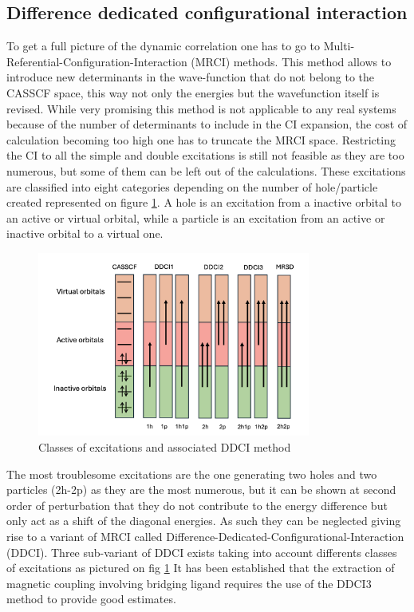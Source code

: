 \documentclass[10pt]{report}
\numberwithin{equation}{section}
\begin{document}
\subsection{Difference dedicated configurational interaction}

To get a full picture of the dynamic correlation one has to go to Multi-Referential-Configuration-Interaction (MRCI) methods.
This method allows to introduce new determinants in the wave-function that do not belong to the CASSCF space, this way not only the energies but the wavefunction itself is revised.
While very promising this method is not applicable to any real systems because of the number of determinants to include in the CI expansion, the cost of calculation becoming too high one has to truncate the MRCI space.
Restricting the CI to all the simple and double excitations is still not feasible as they are too numerous, but some of them can be left out of the calculations. 
These excitations are classified into eight categories depending on the number of hole/particle created represented on figure \ref{DDCI}. 
A hole is an excitation from a inactive orbital to an active or virtual orbital, while a particle is an excitation from an active or inactive orbital to a virtual one.

\begin{figure}
    \centering
    \includegraphics[width=0.8\textwidth]{Images/DDCI.png}
    \caption{Classes of excitations and associated DDCI method}
    \label{DDCI}
\end{figure}
The most troublesome excitations are the one generating two holes and two particles (2h-2p) as they are the most numerous, but it can be shown at second order of perturbation that they do not contribute to the energy difference but only act as a shift of the diagonal energies.
As such they can be neglected giving rise to a variant of MRCI called Difference-Dedicated-Configurational-Interaction (DDCI). 
Three sub-variant of DDCI exists taking into account differents classes of excitations as pictured on fig \ref{DDCI}
It has been established that the extraction of magnetic coupling involving bridging ligand requires the use of the DDCI3 method to provide good estimates.
\end{document}
